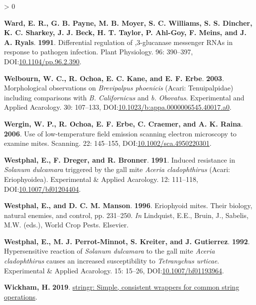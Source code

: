\documentclass{ufdissertation}[overrideChapters] %
\newlength{\cslhangindent}
\newenvironment{CSLReferences}[2] %
 {%
  \setlength{\parindent}{0pt}
  \ifodd #1 \everypar{\setlength{\hangindent}{\cslhangindent}}\ignorespaces\fi
  \ifnum #2 > 0
  \setlength{\parskip}{#2\baselineskip}
  \fi
 }%
 {}
\begin{document}
{\begin{CSLReferences}{1}{1}
\leavevmode{}%
\textbf{Ward, E. R., G. B. Payne, M. B. Moyer, S. C. Williams, S. S. Dincher, K. C. Sharkey, J. J. Beck, H. T. Taylor, P. Ahl-Goy, F. Meins, and J. A. Ryals}. \textbf{1991}. Differential regulation of ,3-glucanase messenger {RNAs} in response to pathogen infection. Plant Physiology. 96: 390--397, DOI:\href{https://doi.org/10.1104/pp.96.2.390}{10.1104/pp.96.2.390}.

\leavevmode{}%
\textbf{Welbourn, W. C., R. Ochoa, E. C. Kane, and E. F. Erbe}. \textbf{2003}. Morphological observations on {\emph{Brevipalpus phoenicis}} ({Acari}: {Tenuipalpidae}) including comparisons with {\emph{B. Californicus}} and {\emph{b. Obovatus}}. Experimental and Applied Acarology. 30: 107--133, DOI:\href{https://doi.org/10.1023/b:appa.0000006545.40017.a0}{10.1023/b:appa.0000006545.40017.a0}.

\leavevmode{}%
\textbf{Wergin, W. P., R. Ochoa, E. F. Erbe, C. Craemer, and A. K. Raina}. \textbf{2006}. Use of low-temperature field emission scanning electron microscopy to examine mites. Scanning. 22: 145--155, DOI:\href{https://doi.org/10.1002/sca.4950220301}{10.1002/sca.4950220301}.

\leavevmode{}%
\textbf{Westphal, E., F. Dreger, and R. Bronner}. \textbf{1991}. Induced resistance in {\emph{Solanum dulcamara}} triggered by the gall mite {\emph{Aceria cladophthirus}} ({Acari}: {Eriophyoidea}). Experimental {\&} Applied Acarology. 12: 111--118, DOI:\href{https://doi.org/10.1007/bf01204404}{10.1007/bf01204404}.

\leavevmode{}%
\textbf{Westphal, E., and D. C. M. Manson}. \textbf{1996}. Eriophyoid mites. Their biology, natural enemies, and control, pp. 231--250. \emph{In} Lindquist, E.E., Bruin, J., Sabelis, M.W. (eds.), World Crop Pests. Elsevier.

\leavevmode{}%
\textbf{Westphal, E., M. J. Perrot-Minnot, S. Kreiter, and J. Gutierrez}. \textbf{1992}. Hypersensitive reaction of {\emph{Solanum dulcamara}} to the gall mite {\emph{Aceria cladophthirus}} causes an increased susceptibility to {\emph{Tetranychus urticae}}. Experimental {\&} Applied Acarology. 15: 15--26, DOI:\href{https://doi.org/10.1007/bf01193964}{10.1007/bf01193964}.

\leavevmode{}%
\textbf{Wickham, H.} \textbf{2019}. \href{https://CRAN.R-project.org/package=stringr}{{stringr}: Simple, consistent wrappers for common string operations}.


\end{CSLReferences}}
\end{document}
